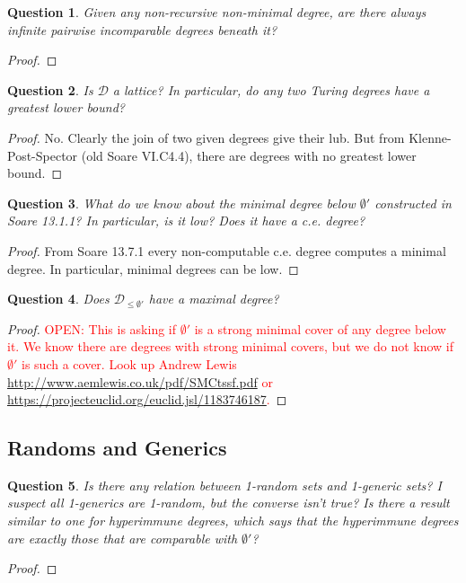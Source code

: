 \documentclass{article}
\newcommand{\OPEN}[1]{\textcolor{red}{OPEN: #1}}
\newtheorem{question}{Question}[subsection]
\begin{document}
    \begin{question}
      Given any non-recursive non-minimal degree, are there always infinite
      pairwise incomparable degrees beneath it?
    \end{question}
    \begin{proof}
    \end{proof}

    \begin{question}
      Is $\mathcal{D}$ a lattice? In particular, do any two Turing degrees
      have a greatest lower bound?
    \end{question}
    \begin{proof}
      No. Clearly the join of two given degrees give their lub. But from
      Klenne-Post-Spector (old Soare VI.C4.4), there are degrees with no
      greatest lower bound.
    \end{proof}

    \begin{question}
      What do we know about the minimal degree below $\emptyset'$
      constructed in Soare 13.1.1? In particular, is it low? Does it have a
      c.e. degree?
    \end{question}
    \begin{proof}
      From Soare 13.7.1 every non-computable c.e. degree computes a minimal
      degree. In particular, minimal degrees can be low.
    \end{proof}

    \begin{question}
      Does $\mathcal{D}_{\leq\emptyset'}$ have a maximal degree?
    \end{question}
    \begin{proof}
      \OPEN{This is asking if $\emptyset'$ is a strong minimal cover of any
      degree below it. We know there are degrees with strong minimal
      covers, but we do not know if $\emptyset'$ is such a cover. Look up
      Andrew Lewis \url{http://www.aemlewis.co.uk/pdf/SMCtssf.pdf} or
      \url{https://projecteuclid.org/euclid.jsl/1183746187}.}
    \end{proof}

  \subsection{Randoms and Generics}
    \begin{question}
      Is there any relation between 1-random sets and 1-generic sets? I
      suspect all 1-generics are 1-random, but the converse isn't true? Is
      there a result similar to one for hyperimmune degrees, which says
      that the hyperimmune degrees are exactly those that are comparable
      with $\emptyset'$?
    \end{question}
    \begin{proof}
    \end{proof}
\end{document}
